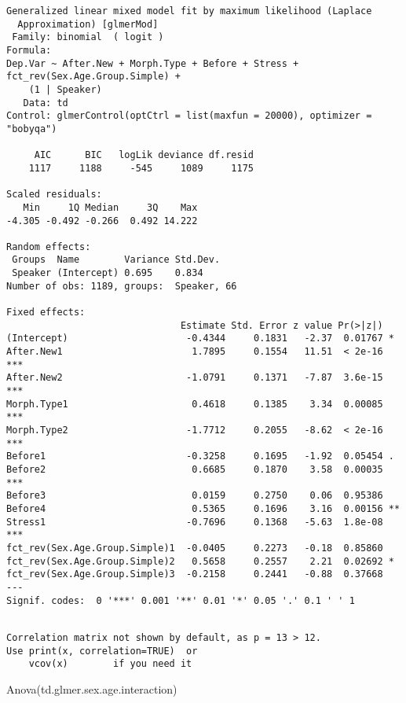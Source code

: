 \documentclass[
  10pt,
  letterpaper]{article}
\newenvironment{Shaded}{\begin{snugshade}}{\end{snugshade}}
\newcommand{\FunctionTok}[1]{\textcolor[rgb]{0.28,0.35,0.67}{#1}}
\newcommand{\NormalTok}[1]{\textcolor[rgb]{0.00,0.23,0.31}{#1}}
\begin{document}
\begin{verbatim}
Generalized linear mixed model fit by maximum likelihood (Laplace
  Approximation) [glmerMod]
 Family: binomial  ( logit )
Formula: 
Dep.Var ~ After.New + Morph.Type + Before + Stress + fct_rev(Sex.Age.Group.Simple) +  
    (1 | Speaker)
   Data: td
Control: glmerControl(optCtrl = list(maxfun = 20000), optimizer = "bobyqa")

     AIC      BIC   logLik deviance df.resid 
    1117     1188     -545     1089     1175 

Scaled residuals: 
   Min     1Q Median     3Q    Max 
-4.305 -0.492 -0.266  0.492 14.222 

Random effects:
 Groups  Name        Variance Std.Dev.
 Speaker (Intercept) 0.695    0.834   
Number of obs: 1189, groups:  Speaker, 66

Fixed effects:
                               Estimate Std. Error z value Pr(>|z|)    
(Intercept)                     -0.4344     0.1831   -2.37  0.01767 *  
After.New1                       1.7895     0.1554   11.51  < 2e-16 ***
After.New2                      -1.0791     0.1371   -7.87  3.6e-15 ***
Morph.Type1                      0.4618     0.1385    3.34  0.00085 ***
Morph.Type2                     -1.7712     0.2055   -8.62  < 2e-16 ***
Before1                         -0.3258     0.1695   -1.92  0.05454 .  
Before2                          0.6685     0.1870    3.58  0.00035 ***
Before3                          0.0159     0.2750    0.06  0.95386    
Before4                          0.5365     0.1696    3.16  0.00156 ** 
Stress1                         -0.7696     0.1368   -5.63  1.8e-08 ***
fct_rev(Sex.Age.Group.Simple)1  -0.0405     0.2273   -0.18  0.85860    
fct_rev(Sex.Age.Group.Simple)2   0.5658     0.2557    2.21  0.02692 *  
fct_rev(Sex.Age.Group.Simple)3  -0.2158     0.2441   -0.88  0.37668    
---
Signif. codes:  0 '***' 0.001 '**' 0.01 '*' 0.05 '.' 0.1 ' ' 1
\end{verbatim}

\begin{verbatim}

Correlation matrix not shown by default, as p = 13 > 12.
Use print(x, correlation=TRUE)  or
    vcov(x)        if you need it
\end{verbatim}

\begin{Shaded}
\begin{Highlighting}[]
\FunctionTok{Anova}\NormalTok{(td.glmer.sex.age.interaction)}
\end{Highlighting}
\end{Shaded}
\end{document}
